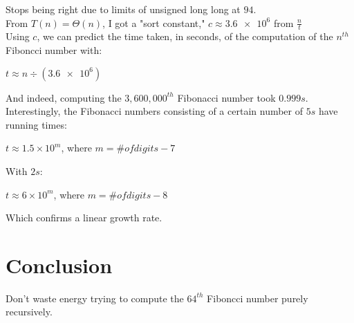 \documentclass{article}
\begin{document}
\hspace{1em} Stops being right due to limits of unsigned long long at $94$. \\

	From $T(n) = \Theta (n)$, I got a "sort constant," $c \approx \num{3.6e6}$ from $\frac{n}{t}$ \\

Using $c$, we can predict the time taken, in seconds, of the computation of the $n^{th}$ Fiboncci number with: 

\begin{center}
$t \approx {n} \div (\num{3.6e6})$
\end{center}

And indeed, computing the $3,600,000^{th}$ Fibonacci number took $0.999s$. \\

Interestingly, the Fibonacci numbers consisting of a certain number of $5s$ have running times:

\begin{center}
$t \approx 1.5 \times 10^{m}$, where $m = \# of digits - 7$
\end{center}

With $2s$:

\begin{center}
$t \approx 6 \times 10^{m}$, where $m = \# of digits - 8$
\end{center}

Which confirms a linear growth rate.

\section{Conclusion}

\hspace{1em} Don't waste energy trying to compute the $64^{th}$ Fiboncci number purely recursively.
\end{document}
